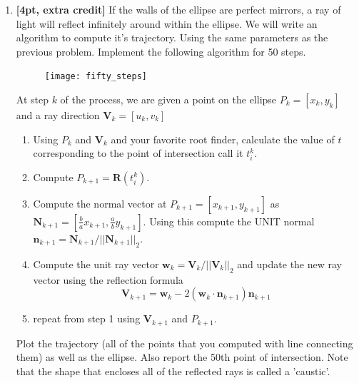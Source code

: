 \documentclass[11pt]{article}
\begin{document}
\begin{enumerate}
\item {\bf [4pt, extra credit]} If the walls of the ellipse are perfect mirrors, a
  ray of light will reflect infinitely around within the ellipse. We
  will write an algorithm to compute it's trajectory. Using the same
  parameters as the previous problem. Implement the following
  algorithm for 50 steps.
	\begin{figure}[h!]
	\centering
	\texttt{[image: fifty\_steps]}
	\end{figure}
At step $k$ of the process, we are given a point on the ellipse $P_k =
[x_k,y_k]$ and a ray direction $\textbf{V}_k = [u_k,v_k]$
\begin{enumerate}
	\item Using $P_k$ and $\textbf{V}_k$ and your favorite root
          finder, calculate the value of $t$ corresponding to the
          point of intersection call it $t_i^k$.
	\item Compute $P_{k+1} = \textbf{R}(t_i^k)$.
	\item Compute the normal vector at $P_{k+1} = [x_{k+1},
          y_{k+1}]$ as $\textbf{N}_{k+1} = [\frac{b}{a} x_{k+1},
          \frac{a}{b} y_{k+1}]$. Using this compute the UNIT normal
          $\textbf{n}_{k+1} =
          \textbf{N}_{k+1}/||\textbf{N}_{k+1}||_2$.
	\item Compute the unit ray vector $\textbf{w}_k =
          \textbf{V}_k/||\textbf{V}_k||_2$ and update the new ray
          vector using the reflection formula
	\[
	 \textbf{V}_{k+1} = \textbf{w}_k - 2 \left( \textbf{w}_k \cdot
         \textbf{n}_{k+1}\right) \textbf{n}_{k+1}
	\]
        \item repeat from step 1 using $\textbf{V}_{k+1}$ and $P_{k+1}$.
\end{enumerate} 
 Plot the trajectory (all of the points that you computed with line
 connecting them) as well as the ellipse. Also report the 50th point
 of intersection. Note that the shape that encloses all of the
 reflected rays is called a 'caustic'.



\end{enumerate}
\end{document}
